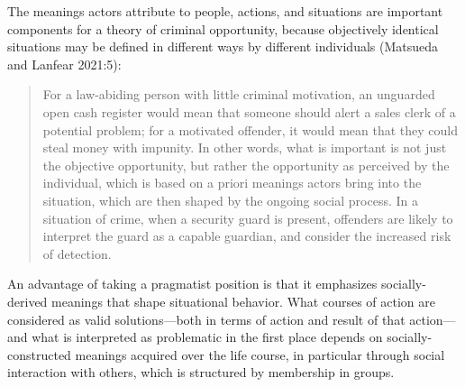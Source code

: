 \documentclass [11pt, proquest] {uwthesis}[2015/03/03]
\begin{document}
The meanings actors attribute to people, actions, and situations are important components for a theory of criminal opportunity, because objectively identical situations may be defined in different ways by different individuals (Matsueda and Lanfear 2021:5):
\begin{quote}
For a law-abiding person with little criminal motivation, an unguarded open cash register would mean that someone should alert a sales clerk of a potential problem; for a motivated offender, it would mean that they could steal money with impunity. In other words, what is important is not just the objective opportunity, but rather the opportunity as perceived by the individual, which is based on a priori meanings actors bring into the situation, which are then shaped by the ongoing social process. In a situation of crime, when a security guard is present, offenders are likely to interpret the guard as a capable guardian, and consider the increased risk of detection.
\end{quote}
An advantage of taking a pragmatist position is that it emphasizes socially-derived meanings that shape situational behavior. What courses of action are considered as valid solutions---both in terms of action and result of that action---and what is interpreted as problematic in the first place depends on socially-constructed meanings acquired over the life course, in particular through social interaction with others, which is structured by membership in groups.
\end{document}
